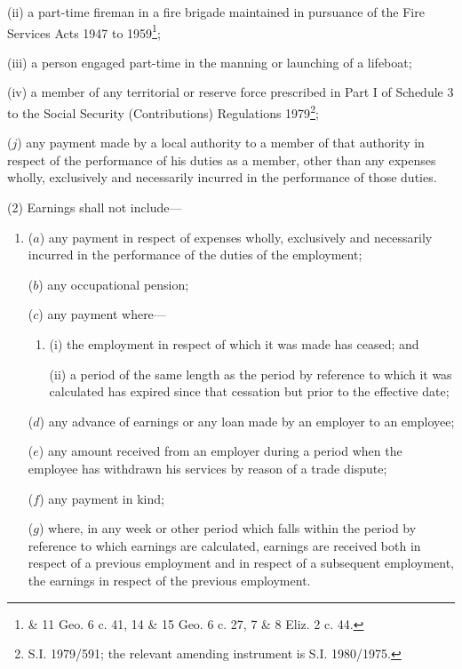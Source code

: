 \documentclass[a4paper]{article}
\begin{document}
\begin{enumerate}
\begin{enumerate}
(ii) a part-time fireman in a fire brigade maintained in pursuance of the Fire Services Acts 1947 to 1959\footnote{ \& 11 Geo. 6 c. 41, 14 \& 15 Geo. 6 c. 27, 7 \& 8 Eliz. 2 c. 44.};

(iii) a person engaged part-time in the manning or launching of a lifeboat;

(iv) a member of any territorial or reserve force prescribed in Part I of Schedule 3 to the Social Security (Contributions) Regulations 1979\footnote{\frenchspacing S.I. 1979/591; the relevant amending instrument is S.I. 1980/1975.};
\end{enumerate}

($j$) any payment made by a local authority to a member of that authority in respect of the performance of his duties as a member, other than any expenses wholly, exclusively and necessarily incurred in the performance of those duties.
\end{enumerate}

(2) Earnings shall not include—
\begin{enumerate}\item[]
($a$) any payment in respect of expenses wholly, exclusively and necessarily incurred in the performance of the duties of the employment;

($b$) any occupational pension;

($c$) any payment where—
\begin{enumerate}\item[]
(i) the employment in respect of which it was made has ceased; and

(ii) a period of the same length as the period by reference to which it was calculated has expired since that cessation but prior to the effective date;
\end{enumerate}

($d$) any advance of earnings or any loan made by an employer to an employee;

($e$) any amount received from an employer during a period when the employee has withdrawn his services by reason of a trade dispute;

($f$) any payment in kind;

($g$) where, in any week or other period which falls within the period by reference to which earnings are calculated, earnings are received both in respect of a previous employment and in respect of a subsequent employment, the earnings in respect of the previous employment.
\end{enumerate}
\end{document}
